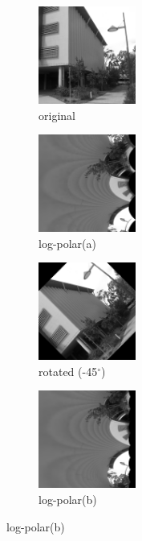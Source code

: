 \begin{figure}[t!] 
        \centering
        \begin{subfigure}[b]{3.4cm}
                \includegraphics[width=3.2cm]{images/pc/original}
                \caption{original}
                \label{fig:PCSecOrig2}
        \end{subfigure}%
        \begin{subfigure}[b]{3.4cm}
                \includegraphics[width=3.2cm]{images/pc/logpolar}
                \caption{log-polar(a)}
                \label{fig:PCSecLP}
        \end{subfigure}%
         \begin{subfigure}[b]{3.4cm}
                \includegraphics[width=3.2cm]{images/pc/rotation}
                \caption{rotated (-45${}^{\circ}$)}
                \label{fig:PCSecRot}
        \end{subfigure}%
        \begin{subfigure}[b]{3.4cm}
                \includegraphics[width=3.2cm]{images/pc/logpolarRotation}
                \caption{log-polar(b)}
                \label{fig:PCSecLPR}
        \end{subfigure}

\end{figure}
